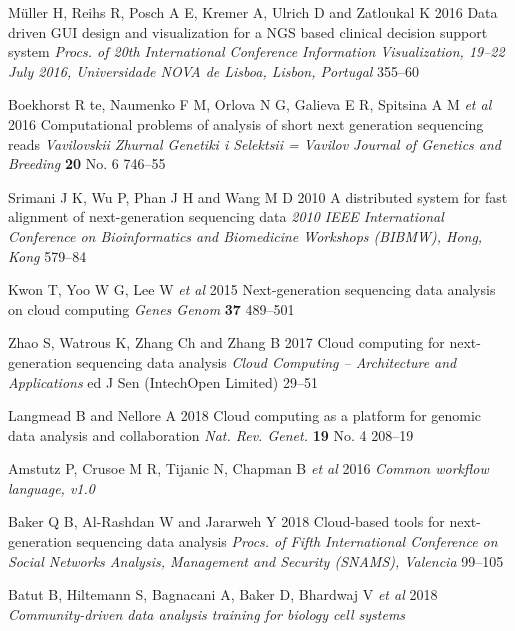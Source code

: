 \documentclass[a4paper]{jpconf}
\renewcommand{\doi}[1]{} %
\begin{document}
\begin{thebibliography}{0}
 Müller H, Reihs R, Posch A E, Kremer A, Ulrich D and Zatloukal K 2016 Data driven GUI design and visualization for a NGS based clinical decision support system \emph{Procs. of 20th International Conference Information Visualization, 19--22 July 2016, Universidade NOVA de Lisboa, Lisbon, Portugal} 355--60 \doi{10.1109/IV.2016.79}

 Boekhorst R te, Naumenko F M, Orlova N G, Galieva E R, Spitsina A M \emph{et al} 2016 Computational problems of analysis of short next generation sequencing reads \emph{Vavilovskii Zhurnal Genetiki i Selektsii = Vavilov Journal of Genetics and Breeding} \textbf{20} No. 6 746--55 \doi{10.18699/VJ16.191}

 Srimani J K, Wu P, Phan J H and Wang M D 2010 A distributed system for fast alignment of next-generation sequencing data \emph{2010 IEEE International Conference on Bioinformatics and Biomedicine Workshops (BIBMW), Hong, Kong} 579--84 \doi{10.1109/BIBMW.2010.5703865}

 Kwon T, Yoo W G, Lee W \emph{et al} 2015 Next-generation sequencing data analysis on cloud computing \emph{Genes Genom} \textbf{37} 489--501 \doi{10.1007/s13258-015-0280-7}

 Zhao S, Watrous K, Zhang Ch and Zhang B 2017 Cloud computing for next-generation sequencing data analysis \emph{Cloud Computing -- Architecture and Applications} ed J Sen (IntechOpen Limited) 29--51 \doi{10.5772/66732}

 Langmead B and Nellore A 2018 Cloud computing as a platform for genomic data analysis and collaboration \emph{Nat. Rev. Genet.} \textbf{19} No. 4 208--19 \doi{10.1038/nrg.2017.113}

 Amstutz P, Crusoe M R, Tijanic N, Chapman B \emph{et al} 2016 \emph{Common workflow language, v1.0} \doi{10.6084/m9.figshare.3115156.v2}

 Baker Q B,  Al-Rashdan W and Jararweh Y 2018 Cloud-based tools for next-generation sequencing data analysis \emph{Procs. of Fifth International Conference on Social Networks Analysis, Management and Security (SNAMS), Valencia} 99--105 \doi{10.1109/SNAMS.2018.8554515}


 Batut B, Hiltemann S, Bagnacani A, Baker D, Bhardwaj V \emph{et al} 2018 \emph{Community-driven data analysis training for biology cell systems} \doi{10.1016/j.cels.2018.05.012}


\end{thebibliography}
\end{document}
